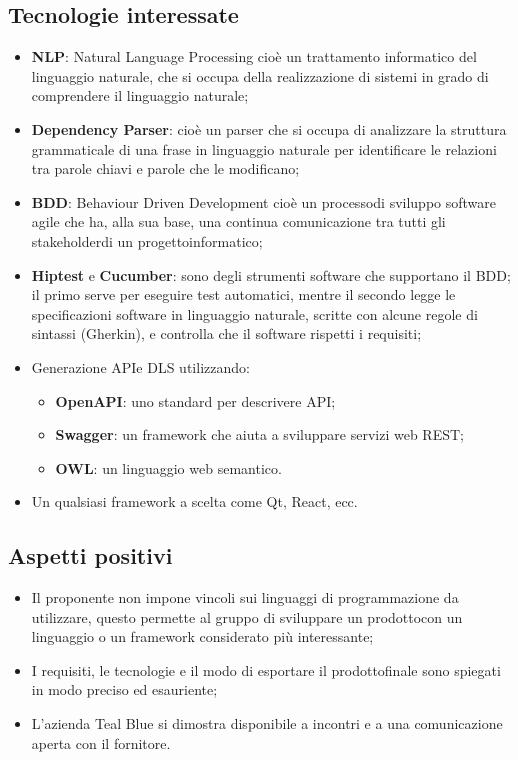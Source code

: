 \subsection{Tecnologie interessate}
\begin{itemize}
	\item \textbf{NLP}: Natural Language Processing cioè un trattamento informatico del linguaggio naturale, che si occupa della realizzazione di sistemi in grado di comprendere il linguaggio naturale;	
	\item \textbf{Dependency Parser}: cioè un parser che si occupa di analizzare la struttura grammaticale di una frase in linguaggio naturale per identificare le relazioni tra parole chiavi e parole che le modificano;
	\item \textbf{BDD}: Behaviour Driven Development cioè un processo\glosp di sviluppo software agile che ha, alla sua base, una continua comunicazione tra tutti gli stakeholder\glosp di un progetto\glosp informatico;
	\item \textbf{Hiptest} e \textbf{Cucumber}: sono degli strumenti software che supportano il BDD; il primo serve per eseguire test automatici, mentre il secondo legge le specificazioni software in linguaggio naturale, scritte con alcune regole di sintassi (Gherkin), e controlla che il software rispetti i requisiti;
	\item Generazione API\glosp e DLS utilizzando:
	\begin{itemize}
		\item \textbf{OpenAPI}: uno standard per descrivere API\glo;
		\item \textbf{Swagger}: un framework che aiuta a sviluppare servizi web REST\glo;
		\item \textbf{OWL}: un linguaggio web semantico.
	\end{itemize}
	\item Un qualsiasi framework a scelta come Qt, React, ecc.
\end{itemize} 
\subsection{Aspetti positivi}
\begin{itemize} 
	\item Il proponente non impone vincoli sui linguaggi di programmazione da utilizzare, questo permette al gruppo di sviluppare un prodotto\glosp con un linguaggio o un framework considerato più interessante;
	\item I requisiti, le tecnologie e il modo di esportare il prodotto\glosp finale sono spiegati in modo preciso ed esauriente;
	\item L'azienda Teal Blue si dimostra disponibile a incontri e a una comunicazione aperta con il fornitore.
\end{itemize}
